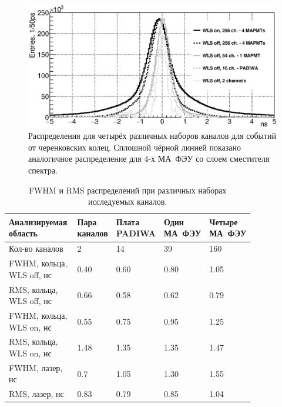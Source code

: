 \begin{figure}[H]
\centering
\includegraphics[width=1.0\textwidth]{pictures/Time_precision_evolution_rings_6_bw_noMirror_20Mar2017.eps}
\caption{Распределения для четырёх различных наборов каналов для событий от черенковских колец. Сплошной чёрной линией показано аналогичное распределение для 4-х МА~ФЭУ со слоем сместителя спектра.}
\label{fig:TimeResEvolutionRings}
\end{figure}



\begin{table}[H]
\caption{FWHM и RMS распределений при различных наборах исследуемых каналов.}
\label{tabl:EvolutionParams}
\begin{tabular}{ | p{0.30\linewidth} | p{0.12\linewidth} | p{0.13\linewidth} | p{0.13\linewidth} | p{0.15\linewidth} | }
	\hline
	\scriptsize{Анализируемая область} & \scriptsize{Пара каналов} & \scriptsize{Плата PADIWA} & \scriptsize{Один МА~ФЭУ} & \scriptsize{Четыре МА~ФЭУ} \\
	\hline \hline
	\scriptsize{Кол-во каналов} & 2 & 14 & 39 & 160 \\
	\hline
	\scriptsize{FWHM, кольца, WLS off, нс} & 0.40 & 0.60 & 0.80 & 1.05 \\
	\hline
	\scriptsize{RMS, кольца, WLS off, нс} & 0.66 & 0.58 & 0.62 & 0.79 \\
	\hline
	\scriptsize{FWHM, кольца, WLS on, нс} & 0.55 & 0.75 & 0.95 & 1.25 \\
	\hline
	\scriptsize{RMS, кольца, WLS on, нс} & 1.48 & 1.35 & 1.35 & 1.47 \\
	\hline \hline
	\scriptsize{FWHM, лазер, нс} & 0.7 & 1.05 & 1.30 & 1.55 \\
	\hline
	\scriptsize{RMS, лазер, нс} & 0.83 & 0.79 & 0.85 & 1.04 \\
	\hline
\end{tabular}
\end{table}
